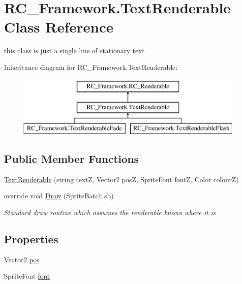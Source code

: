 \hypertarget{class_r_c___framework_1_1_text_renderable}{}\section{R\+C\+\_\+\+Framework.\+Text\+Renderable Class Reference}
\label{class_r_c___framework_1_1_text_renderable}


this class is just a single line of stationary text  


Inheritance diagram for R\+C\+\_\+\+Framework.\+Text\+Renderable\+:\begin{figure}[H]
\begin{center}
\leavevmode
\includegraphics[height=3.000000cm]{class_r_c___framework_1_1_text_renderable}
\end{center}
\end{figure}
\subsection*{Public Member Functions}
\begin{DoxyCompactItemize}
\item 
\mbox{\hyperlink{class_r_c___framework_1_1_text_renderable_a515d0404695d1e3cf47dcbca7542b8eb}{Text\+Renderable}} (string textZ, Vector2 posZ, Sprite\+Font fontZ, Color colourZ)
\item 
override void \mbox{\hyperlink{class_r_c___framework_1_1_text_renderable_aea36ff48ac5dc6a336d998111457f019}{Draw}} (Sprite\+Batch sb)
\begin{DoxyCompactList}\small\item\em Standard draw routine which assumes the renderable knows where it is \end{DoxyCompactList}\end{DoxyCompactItemize}
\subsection*{Properties}
\begin{DoxyCompactItemize}
\item 
Vector2 \mbox{\hyperlink{class_r_c___framework_1_1_text_renderable_acb33b5c611b560855cef771c05beb4a7}{pos}}
\item 
Sprite\+Font \mbox{\hyperlink{class_r_c___framework_1_1_text_renderable_a3815dc8e8a0aa592e586d39f81dfb0ac}{font}}
\end{DoxyCompactItemize}
